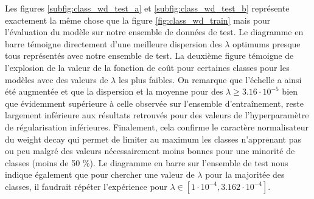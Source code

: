 \documentclass[12pt,english, openany]{book}
\begin{document}
Les figures \ref{subfig:class_wd_test_a} et \ref{subfig:class_wd_test_b} représente exactement la même chose que la figure \ref{fig:class_wd_train} mais pour l'évaluation du modèle sur notre ensemble de données de test. Le diagramme en barre témoigne directement d'une meilleure dispersion des $\lambda$ optimums presque tous représentés avec notre ensemble de test. La deuxième figure témoigne de l'explosion de la valeur de la fonction de coût pour certaines classes pour les modèles avec des valeurs de $\lambda$ les plus faibles. On remarque que l'échelle a ainsi été augmentée et que la dispersion et la moyenne pour des $\lambda \geq 3.16\cdot10^{-5}$ bien que évidemment supérieure à celle observée sur l'ensemble d'entraînement, reste largement inférieure aux résultats retrouvés pour des valeurs de l'hyperparamètre de régularisation inférieures. Finalement, cela confirme le caractère normalisateur du weight decay qui permet de limiter au maximum les classes n'apprenant pas ou peu malgré des valeurs nécessairement moins bonnes pour une minorité de classes (moins de 50 \%). Le diagramme en barre sur l'ensemble de test nous indique également que pour chercher une valeur de $\lambda$ pour la majoritée des classes, il faudrait répéter l'expérience pour $\lambda \in [1\cdot 10^{-4}, 3.162\cdot 10^{-4}]$.\\

\end{document}
